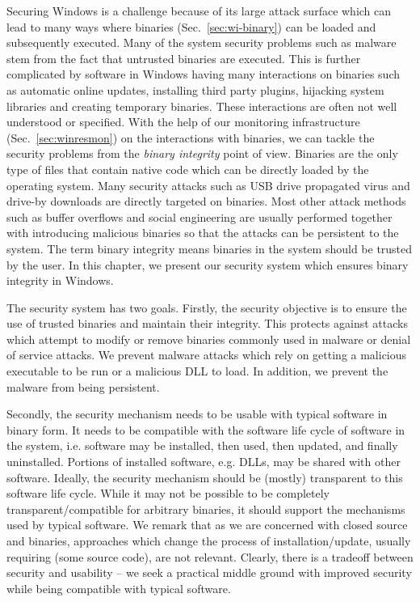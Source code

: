 Securing Windows is a challenge because of its large
attack surface which can lead to many ways where
binaries (Sec.~\ref{sec:wi-binary}) can be loaded and subsequently executed.
Many of the system security problems such as malware
stem from the fact that untrusted binaries are executed.
This is further complicated by
software in Windows having many interactions on binaries such as
automatic online updates, installing third party plugins,
hijacking system libraries and creating temporary binaries.
These interactions are often not well understood or specified.
With the help of our monitoring infrastructure (Sec.~\ref{sec:winresmon})
on the interactions with binaries,
we can tackle the security problems from the {\em binary integrity}
point of view.
Binaries are the only type of files that contain native code which
can be directly loaded by the operating system.
Many security attacks such as USB drive propagated virus and
drive-by downloads are directly targeted on binaries.
Most other attack methods such as buffer overflows and social engineering
are usually performed together with introducing malicious binaries
so that the attacks can be persistent to the system.
The term binary integrity means binaries in the system should be
trusted by the user.
In this chapter, we present our security system which ensures
binary integrity in Windows.

The security system has two goals. Firstly, the security objective
is to ensure the use of trusted binaries and maintain their integrity.
This protects against attacks which attempt to modify or remove binaries
commonly used in malware or denial of service attacks.
We prevent malware attacks which rely on
getting a malicious executable to be run or
a malicious DLL to load.
In addition, we prevent the malware from being persistent.

Secondly, the security mechanism needs to be usable with typical
software in binary form.
It needs to be compatible with the software life cycle of software in the
system, i.e.
software may be installed, then used, then updated, and 
finally uninstalled. 
Portions of installed software, e.g. DLLs,
may be shared with other software. 
Ideally, the security mechanism should be (mostly) transparent to 
this software life cycle.
While it may not be possible to be completely transparent/compatible 
for arbitrary binaries, it should support the mechanisms used 
by typical software.
We remark that as we are concerned with
closed source and binaries,
approaches which change the process of installation/update,
usually requiring (some source code), are not relevant.
Clearly, there is a tradeoff between security and usability --
we seek a practical middle ground with improved security while
being compatible with typical software.

